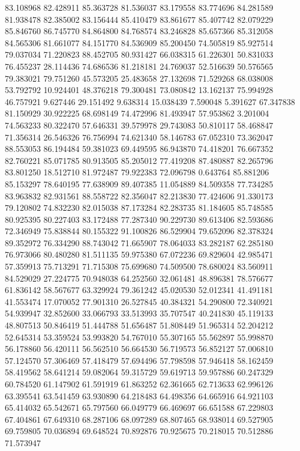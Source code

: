 83.108968
82.428911
85.363728
81.536037
83.179558
83.774696
84.281589
81.938478
82.385002
83.156444
85.410479
83.861677
85.407742
82.079229
85.846760
86.745770
84.864800
84.768574
83.246828
85.657366
85.312058
84.565306
81.661077
84.151770
84.536909
85.200450
74.505819
85.927514
79.037034
71.220823
88.452705
80.931427
66.038315
61.226301
50.831033
76.455237
28.114436
74.686536
81.218181
24.769037
52.516639
50.576565
79.383021
79.751260
45.573205
25.483658
27.132698
71.529268
68.038008
53.792792
10.924401
48.376218
79.300481
73.080842
13.162137
75.994928
46.757921
9.627446
29.151492
9.638314
15.038439
7.590048
5.391627
67.347838
81.150929
30.922225
68.698149
74.472996
81.493947
57.953862
3.201004
74.563233
80.322470
57.646331
39.579978
29.743083
50.810117
58.468847
71.356314
26.546326
76.756994
74.621340
58.146783
67.052310
73.362047
88.553053
86.194484
59.381023
69.449595
86.943870
74.418201
76.667352
82.760221
85.071785
80.913505
85.205012
77.419208
87.480887
82.265796
83.801250
18.512710
81.972487
79.922383
72.096798
0.643764
85.881206
85.153297
78.640195
77.638909
89.407385
11.054889
84.509358
77.734285
83.963832
82.931561
88.558722
82.356047
82.213830
77.424606
91.330173
79.120802
74.832230
82.015038
87.173284
82.283735
81.184605
85.748585
80.925395
80.227403
83.172488
77.287340
90.229730
89.613406
82.593686
72.346949
75.838844
80.155322
91.100826
86.529904
79.652096
82.378324
89.352972
76.334290
88.743042
71.665907
78.064033
83.282187
62.285180
76.973066
80.480280
81.511135
59.975380
67.072236
69.829604
42.985471
57.359913
75.713291
71.715308
75.699680
74.509500
78.680024
83.560911
84.529029
27.224775
70.948038
64.252560
32.061481
48.896381
78.576677
61.836142
58.567677
63.329924
79.361242
45.020530
52.012341
41.491181
41.553474
17.070052
77.901310
26.527845
40.384321
54.290800
72.340921
54.939947
32.852600
33.066793
33.513993
35.707547
40.241830
45.119133
48.807513
50.846419
51.444788
51.656487
51.808449
51.965314
52.204212
52.645314
53.359524
53.993820
54.767010
55.307165
55.562897
55.998870
56.178860
56.420111
56.562510
56.664530
56.719573
56.852127
57.006810
57.124570
57.306469
57.418479
57.694496
57.798598
57.946418
58.162459
58.419562
58.641214
59.082064
59.315729
59.619713
59.957886
60.247329
60.784520
61.147902
61.591919
61.863252
62.361665
62.713633
62.996126
63.395541
63.541459
63.930890
64.218483
64.498356
64.665916
64.921103
65.414032
65.542671
65.797560
66.049779
66.469697
66.651588
67.229803
67.404861
67.649310
68.287106
68.097289
68.807465
68.938014
69.527905
69.759805
70.036894
69.648524
70.892876
70.925675
70.218015
70.512886
71.573947
